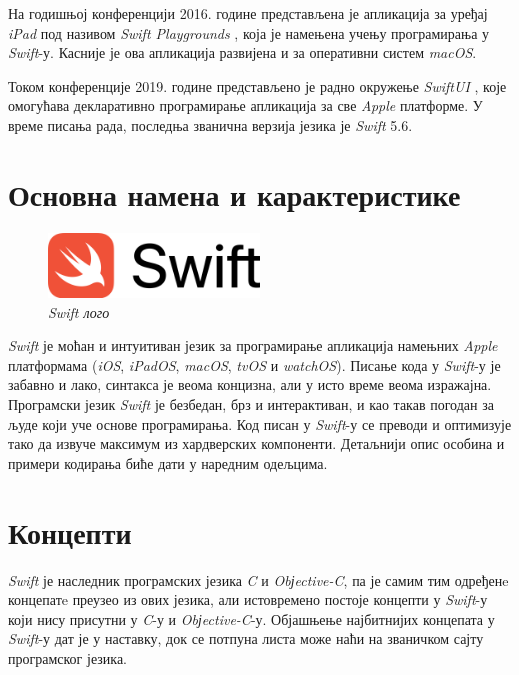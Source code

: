 \documentclass[12pt,oneside]{memoir}
\begin{document}
\indent На годишњој конференцији 2016. године представљена је апликација за уређај \textit{iPad} под називом \textit{Swift Playgrounds} \cite{Swift_Playground}, која је намењена учењу програмирања у \textit{Swift}-у. Касније је ова апликација развијена и за оперативни систем \textit{macOS}.

\indent Током конференције 2019. године представљено је радно окружење \textit{SwiftUI} \cite{Swift_SwiftUI}, које омогућава декларативно програмирање апликација за све \textit{Apple} платформе. У време писања рада, последња званична верзија језика је \textit{Swift} 5.6.

\section{Основна намена и карактеристике}

\begin{figure}[H]
\includegraphics[width=0.5\textwidth]{images/Swift_logo.png}
\centering
\caption{\textit{Swift лого}}
\label{slika:swift_logo}
\end{figure}

\indent \textit{Swift} је моћан и интуитиван језик за програмирање апликација намењних \textit{Apple} платформама (\textit{iOS}, \textit{iPadOS}, \textit{macOS}, \textit{tvOS} и  \textit{watchOS}). Писање кода у \textit{Swift}-у је забавно и лако, синтакса је веома концизна, али у исто време веома изражајна. Програмски језик \textit{Swift} је безбедан, брз и интерактиван, и као такав погодан за људе који уче основе програмирања. Код писан у \textit{Swift}-у се преводи и оптимизује тако да извуче максимум из хардверских компоненти. 
Детаљнији опис особина и примери кодирања биће дати у наредним одељцима. 

\section{Концепти}
\label{sec:Концепти}

\indent \textit{Swift} је наследник програмских језика \textit{C} и \textit{Obјective-C}, па је самим тим одређенe концепатe преузео из ових језика, али истовремено постоје концепти у \textit{Swift}-у који нису присутни у \textit{C}-у и \textit{Obјective-C}-у. Објашњење најбитнијих концепата у \textit{Swift}-у дат је у наставку, док се потпуна листа може наћи на званичком сајту програмског језика. \cite{SwiftOfficialSite}
\end{document}
